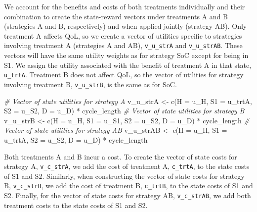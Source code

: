 \documentclass[
]{article}
\newenvironment{Shaded}{\begin{snugshade}}{\end{snugshade}}
\newcommand{\AttributeTok}[1]{\textcolor[rgb]{0.77,0.63,0.00}{#1}}
\newcommand{\CommentTok}[1]{\textcolor[rgb]{0.56,0.35,0.01}{\textit{#1}}}
\newcommand{\FunctionTok}[1]{\textcolor[rgb]{0.00,0.00,0.00}{#1}}
\newcommand{\NormalTok}[1]{#1}
\newcommand{\OtherTok}[1]{\textcolor[rgb]{0.56,0.35,0.01}{#1}}
\newcommand{\SpecialCharTok}[1]{\textcolor[rgb]{0.00,0.00,0.00}{#1}}
\begin{document}
We account for the benefits and costs of both treatments individually and their combination to create the state-reward vectors under treatments A and B (strategies A and B, respectively) and when applied jointly (strategy AB). Only treatment A affects QoL, so we create a vector of utilities specific to strategies involving treatment A (strategies A and AB), \texttt{v\_u\_strA} and \texttt{v\_u\_strAB}. These vectors will have the same utility weights as for strategy SoC except for being in S1. We assign the utility associated with the benefit of treatment A in that state, \texttt{u\_trtA}. Treatment B does not affect QoL, so the vector of utilities for strategy involving treatment B, \texttt{v\_u\_strB}, is the same as for SoC.

\begin{Shaded}
\begin{Highlighting}[]
\CommentTok{\# Vector of state utilities for strategy A}
\NormalTok{v\_u\_strA }\OtherTok{\textless{}{-}} \FunctionTok{c}\NormalTok{(}\AttributeTok{H =}\NormalTok{ u\_H, }\AttributeTok{S1 =}\NormalTok{ u\_trtA, }\AttributeTok{S2 =}\NormalTok{ u\_S2, }\AttributeTok{D =}\NormalTok{ u\_D) }\SpecialCharTok{*}\NormalTok{ cycle\_length }
\CommentTok{\# Vector of state utilities for strategy B}
\NormalTok{v\_u\_strB }\OtherTok{\textless{}{-}} \FunctionTok{c}\NormalTok{(}\AttributeTok{H =}\NormalTok{ u\_H, }\AttributeTok{S1 =}\NormalTok{ u\_S1, }\AttributeTok{S2 =}\NormalTok{ u\_S2, }\AttributeTok{D =}\NormalTok{ u\_D) }\SpecialCharTok{*}\NormalTok{ cycle\_length }
\CommentTok{\# Vector of state utilities for strategy AB}
\NormalTok{v\_u\_strAB }\OtherTok{\textless{}{-}} \FunctionTok{c}\NormalTok{(}\AttributeTok{H =}\NormalTok{ u\_H, }\AttributeTok{S1 =}\NormalTok{ u\_trtA, }\AttributeTok{S2 =}\NormalTok{ u\_S2, }\AttributeTok{D =}\NormalTok{ u\_D) }\SpecialCharTok{*}\NormalTok{ cycle\_length }
\end{Highlighting}
\end{Shaded}

Both treatments A and B incur a cost. To create the vector of state costs for strategy A, \texttt{v\_c\_strA}, we add the cost of treatment A, \texttt{c\_trtA}, to the state costs of S1 and S2. Similarly, when constructing the vector of state costs for strategy B, \texttt{v\_c\_strB}, we add the cost of treatment B, \texttt{c\_trtB}, to the state costs of S1 and S2. Finally, for the vector of state costs for strategy AB, \texttt{v\_c\_strAB}, we add both treatment costs to the state costs of S1 and S2.
\end{document}
